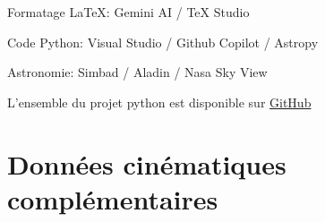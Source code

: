 \documentclass[a4paper, 11pt]{article}
\begin{document}
	Formatage LaTeX: Gemini AI / TeX Studio
	
	Code Python: Visual Studio / Github Copilot / Astropy
	
	Astronomie: Simbad / Aladin / Nasa Sky View
	
	L'ensemble du projet python est disponible sur \href{https://github.com/KyuriTaima/CygnusDynamics}{GitHub}
	
	\newpage
	
	\appendix
	\section{Données cinématiques complémentaires}
	\label{annexe:donnees_complémentaires}
		\begin{table}[H]
			\centering
			\vspace{0.2cm}
			
\end{table}
\end{document}
